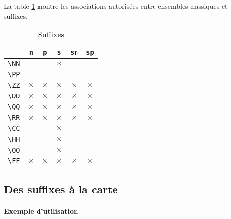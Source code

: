 \documentclass[12pt,a4paper]{article}
\begin{document}
\begin{remark}
	La table \ref{table:suffixes-sets}  montre les associations autorisées entre ensembles classiques et suffixes.
\end{remark}


\begin{table}[h]
    \caption{Suffixes}
    \begin{center}
        \begin{tabular}{c|c|c|c|c|c}
              & \verb+n+ & \verb+p+ & \verb+s+ & \verb+sn+ & \verb+sp+ \\
            \hline \verb+\NN+ &          &          & $\times$ &          &          \\
            \hline \verb+\PP+ &          &          &          &          &          \\
            \hline \verb+\ZZ+ & $\times$ & $\times$ & $\times$ & $\times$ & $\times$ \\
            \hline \verb+\DD+ & $\times$ & $\times$ & $\times$ & $\times$ & $\times$ \\
            \hline \verb+\QQ+ & $\times$ & $\times$ & $\times$ & $\times$ & $\times$ \\
            \hline \verb+\RR+ & $\times$ & $\times$ & $\times$ & $\times$ & $\times$ \\
            \hline \verb+\CC+ &          &          & $\times$ &          &          \\
            \hline \verb+\HH+ &          &          & $\times$ &          &          \\
            \hline \verb+\OO+ &          &          & $\times$ &          &          \\
            \hline \verb+\FF+ & $\times$ & $\times$ & $\times$ & $\times$ & $\times$ \\
        \end{tabular}
    \end{center}
    \label{table:suffixes-sets}
\end{table}




\subsection{Des suffixes à la carte}

\paragraph{Exemple d'utilisation}
\end{document}
